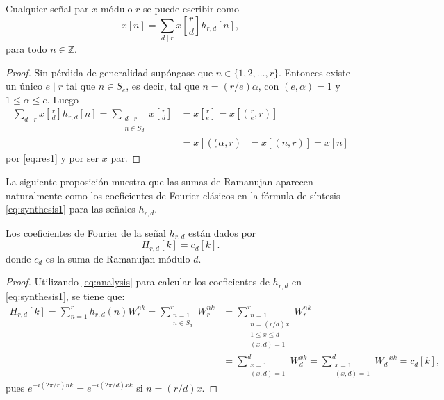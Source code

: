 \begin{proposition}\label{prop:fou2}
Cualquier señal par $x$ módulo $r$ se puede escribir como
\begin{equation}\label{eq:res2}
    x[n] = \sum_{d \mid r} x \left[ \frac{r}{d} \right] h_{r,d}[n],
\end{equation}
para todo $n \in \mathbb{Z}$.
\end{proposition}

\begin{proof}
Sin pérdida de generalidad supóngase que $n \in \{ 1,2,\ldots,r \}$. Entonces existe un único $e \mid r$ tal que $n \in S_e$, es decir, tal que $n = (r/e) \alpha$, con $(e,\alpha)=1$ y $1 \le \alpha \le e$. Luego
\begin{align*}
    \sum_{d \mid r} x \left[ \frac{r}{d} \right] h_{r,d}[n] = \sum_{\substack{d \mid r \\ n \in S_d}} x \left[ \frac{r}{d} \right] & = x \left[ \frac{r}{e} \right] = x \left[ \left( \frac{r}{e},r \right) \right] \\
                                                            & = x \left[ \left( \frac{r}{e} \alpha,r \right) \right] = x [(n,r)] = x[n]
\end{align*}
por \eqref{eq:res1} y por ser $x$ par.
\end{proof}

La siguiente proposición muestra que las sumas de Ramanujan aparecen naturalmente como los coeficientes de Fourier clásicos en la fórmula de síntesis \eqref{eq:synthesis1} para las señales $h_{r,d}$.

\begin{proposition}
Los coeficientes de Fourier de la señal $h_{r,d}$ están dados por
\begin{equation*}
    H_{r,d}[k] =  c_d[k].
\end{equation*}
donde $c_d$ es la suma de Ramanujan módulo $d$.
\end{proposition}

\begin{proof}
Utilizando \eqref{eq:analysis} para calcular los coeficientes de $h_{r,d}$ en \eqref{eq:synthesis1}, se tiene que:
\begin{equation}\label{eq:res3}
\begin{split}
    H_{r,d}[k] = \sum_{n=1}^{r} h_{r,d}(n) W_r^{n k} = \sum_{\substack{n=1 \\ n \in S_d}}^{r} W_r^{n k} & = \sum_{\substack{n=1 \\ n=(r/d) x \\ 1 \le x \le d \\ (x,d)=1}}^{r} W_r^{n k} \\
    &= \sum_{\substack{x = 1 \\ (x,d)=1}}^{d} W_d^{x k} = \sum_{\substack{x = 1 \\ (x,d)=1}}^{d} W_d^{-x k}  = c_d[k],
\end{split}
\end{equation}
pues $e^{-i(2 \pi /r) n k}=e^{-i (2 \pi /d) x k}$ si $n=(r/d)x$.
\end{proof}

